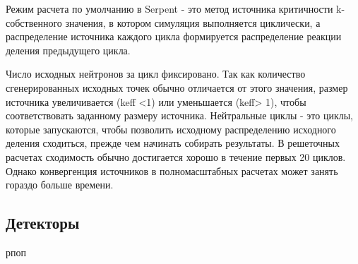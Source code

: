 Режим расчета по умолчанию в Serpent - это метод источника критичности k-собственного значения, в котором симуляция выполняется циклически, а распределение источника каждого цикла формируется распределение реакции деления предыдущего цикла.

Число исходных нейтронов за цикл фиксировано. Так как количество сгенерированных исходных точек обычно отличается от этого значения, размер источника увеличивается (keff <1) или уменьшается (keff> 1), чтобы соответствовать заданному размеру источника. Нейтральные циклы - это циклы, которые запускаются, чтобы позволить исходному распределению исходного деления сходиться, прежде чем начинать собирать результаты. В решеточных расчетах сходимость обычно достигается хорошо в течение первых 20 циклов. Однако конвергенция источников в полномасштабных расчетах может занять гораздо больше времени. 

\subsection{Детекторы}

рпоп